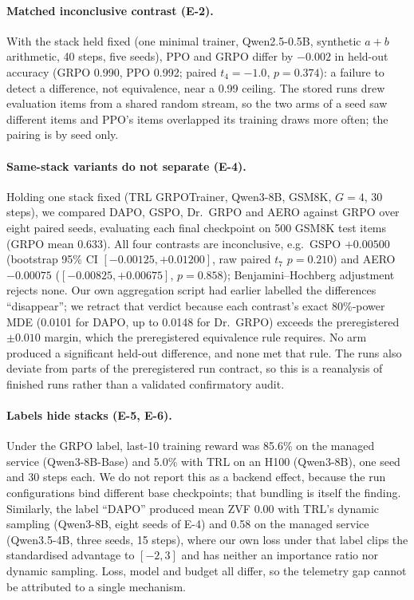 \paragraph{Matched inconclusive contrast (E-2).}
With the stack held fixed (one minimal trainer, Qwen2.5-0.5B, synthetic
$a{+}b$ arithmetic, 40 steps, five seeds), PPO and GRPO differ by $-0.002$ in
held-out accuracy (GRPO 0.990, PPO 0.992; paired $t_4=-1.0$, $p=0.374$): a
failure to detect a difference, not equivalence, near a 0.99 ceiling. The
stored runs drew evaluation items from a shared random stream, so the two
arms of a seed saw different items and PPO's items overlapped its training
draws more often; the pairing is by seed only.

\paragraph{Same-stack variants do not separate (E-4).}
Holding one stack fixed (TRL GRPOTrainer, Qwen3-8B, GSM8K, $G=4$, 30 steps),
we compared DAPO, GSPO, Dr.\ GRPO and AERO \citep{zhang2026aero} against GRPO
over eight paired seeds, evaluating each final checkpoint on 500 GSM8K test
items (GRPO mean 0.633). All four contrasts are inconclusive, e.g.\ GSPO
$+0.00500$ (bootstrap 95\% CI $[-0.00125, +0.01200]$, raw paired $t_7$
$p=0.210$) and AERO $-0.00075$ ($[-0.00825, +0.00675]$, $p=0.858$);
Benjamini--Hochberg adjustment rejects none. Our own aggregation script had
earlier labelled the differences ``disappear''; we retract that verdict
because each contrast's exact 80\%-power MDE (0.0101 for DAPO, up to 0.0148
for Dr.\ GRPO) exceeds the preregistered $\pm0.010$ margin, which the
preregistered equivalence rule requires. No arm produced a significant
held-out difference, and none met that rule. The runs also deviate from
parts of the preregistered run contract, so this is a reanalysis of
finished runs rather than a validated confirmatory audit.

\paragraph{Labels hide stacks (E-5, E-6).}
Under the GRPO label, last-10 training reward was 85.6\% on the managed
service (Qwen3-8B-Base) and 5.0\% with TRL on an H100 (Qwen3-8B), one seed
and 30 steps each. We do not report this as a backend effect, because the run
configurations bind different base checkpoints; that bundling is itself the
finding. Similarly, the label ``DAPO'' produced mean ZVF 0.00 with TRL's
dynamic sampling (Qwen3-8B, eight seeds of E-4) and 0.58 on the managed
service (Qwen3.5-4B, three seeds, 15 steps), where our own loss under that
label clips the standardised advantage to $[-2,3]$ and has neither an
importance ratio nor dynamic sampling. Loss, model and budget all differ, so
the telemetry gap cannot be attributed to a single mechanism.


